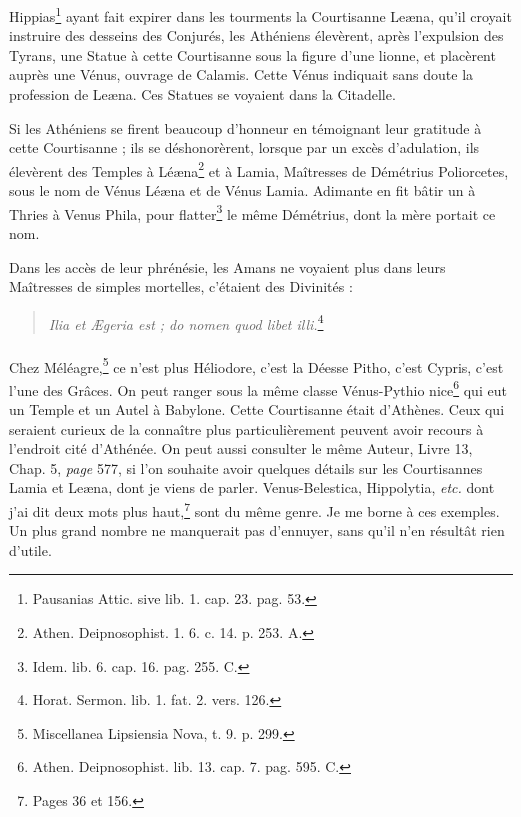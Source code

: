 \documentclass[a4paper, 18pt, oneside]{article}
\begin{document}
Hippias\footnote{Pausanias Attic. sive lib. 1. cap. 23. pag. 53.} ayant fait expirer dans les tourments la Courtisanne Leæna, qu'il croyait instruire des desseins des Conjurés, les Athéniens élevèrent, après l'expulsion des Tyrans, une Statue à cette Courtisanne sous la figure d'une lionne, et placèrent auprès une Vénus, ouvrage de Calamis. Cette Vénus indiquait sans doute la profession de Leæna. Ces Statues se voyaient dans la Citadelle.

Si les Athéniens se firent beaucoup d'honneur en témoignant leur gratitude à cette Courtisanne ; ils se déshonorèrent, lorsque par un excès d'adulation, ils élevèrent des Temples à Léæna\footnote{Athen. Deipnosophist. 1. 6. c. 14. p. 253. A.} et à Lamia, Maîtresses de Démétrius Poliorcetes, sous le nom de Vénus Léæna et de Vénus Lamia. Adimante en fit bâtir un à Thries à Venus Phila, pour flatter\footnote{Idem. lib. 6. cap. 16. pag. 255. C.} le même Démétrius, dont la mère portait ce nom.

Dans les accès de leur phrénésie, les Amans ne voyaient plus dans leurs Maîtresses de simples mortelles, c'étaient des Divinités :
\begin{quotation}
\emph{Ilia et Ægeria est ; do nomen quod libet illi.}\footnote{Horat. Sermon. lib. 1. fat. 2. vers. 126.}
\end{quotation}
\paragraph{}
Chez Méléagre,\footnote{Miscellanea Lipsiensia Nova, t. 9. p. 299.} ce n'est plus Héliodore, c'est la Déesse Pitho, c'est Cypris, c'est l'une des Grâces. On peut ranger sous la même classe Vénus-Pythio nice\footnote{Athen. Deipnosophist. lib. 13. cap. 7. pag. 595. C.} qui eut un Temple et un Autel à Babylone. Cette Courtisanne était d'Athènes. Ceux qui seraient curieux de la connaître plus particulièrement peuvent avoir recours à l'endroit cité d'Athénée. On peut aussi consulter le même Auteur, Livre 13, Chap. 5, \emph{page} 577, si l'on souhaite avoir quelques détails sur les Courtisannes Lamia et Leæna, dont je viens de parler. Venus-Belestica, Hippolytia, \emph{etc.} dont j'ai dit deux mots plus haut,\footnote{Pages 36 et 156.} sont du même genre. Je me borne à ces exemples. Un plus grand nombre ne manquerait pas d'ennuyer, sans qu'il n'en résultât rien d'utile.
\end{document}
